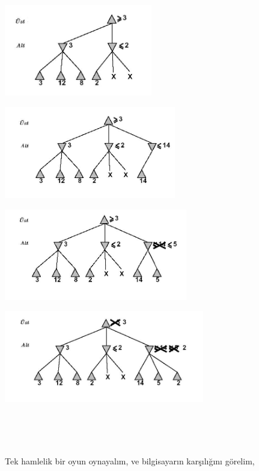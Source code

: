 \documentclass[12pt,fleqn]{article}\usepackage{../../common}
\begin{document}
\includegraphics[height=4cm]{altust_budama_2.jpg}

\includegraphics[height=4cm]{altust_budama_3.jpg}

\includegraphics[height=4cm]{altust_budama_4.jpg}

\includegraphics[height=4cm]{altust_budama_5.jpg}

\inputminted[fontsize=\footnotesize]{python}{dama-alg.lisp}

\inputminted[fontsize=\footnotesize]{python}{dama-deger.lisp}

\inputminted[fontsize=\footnotesize]{python}{dama-oyna.lisp}

\inputminted[fontsize=\footnotesize]{python}{dama-temel.lisp}

\inputminted[fontsize=\footnotesize]{python}{dama-test.lisp}

Tek hamlelik bir oyun oynayalım, ve bilgisayarın karşılığını görelim, 
\end{document}
